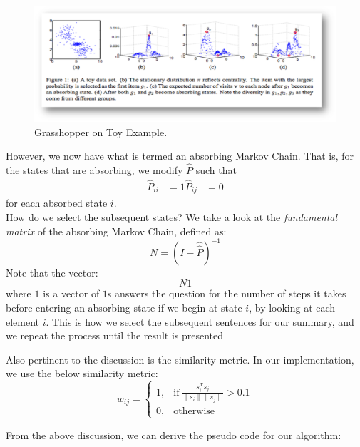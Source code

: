 \documentclass[11pt]{article}
\begin{document}
\begin{figure}[h!]
\centering
\includegraphics[scale=0.4]{grasshopper}
\caption{Grasshopper on Toy Example.}
\label{fig:grasshopper}
\end{figure}

However, we now have what is termed an absorbing Markov Chain. That is, for the states that are absorbing, we modify $\hat{P}$ such that
\begin{align*}
\hat{P}_{ii} &= 1
\hat{P}_{ij} &= 0 \tag{$i \neq j$}
\end{align*}
for each absorbed state $i$. \\

How do we select the subsequent states? We take a look at the \textit{fundamental matrix} of the absorbing Markov Chain, defined as:
$$
N = (I - \hat{\hat{P}})^{-1}
$$
Note that the vector:
$$
N 1
$$
where $1$ is a vector of $1$s answers the question for the number of steps it takes before entering an absorbing state if we begin at state $i$, by looking at each element $i$. This is how we select the subsequent sentences for our summary, and we repeat the process until the result is presented


Also pertinent to the discussion is the similarity metric. In our implementation, we use the below similarity metric:
  \begin{equation}
    w_{ij} =
    \begin{cases}
      1, & \text{if}\ \frac{s_{i}^\text{T}s_j}{\|s_i\| \|s_j\|} > 0.1 \\
      0, & \text{otherwise}
    \end{cases}
  \end{equation}


From the above discussion, we can derive the pseudo code for our algorithm:
\end{document}
